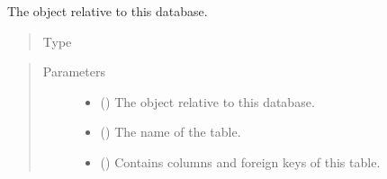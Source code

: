 \documentclass[letterpaper,10pt,english]{sphinxmanual}
\begin{document}
\begin{fulllineitems}
\begin{fulllineitems}
\begin{quote}
\begin{description}
\end{description}\end{quote}

\end{fulllineitems}


\begin{fulllineitems}
\label{\detokenize{model:simple_sql.model.table.Table.__metadata}}
\sphinxAtStartPar
The  object relative to this database.
\begin{quote}\begin{description}
\item[{Type}] \leavevmode
\sphinxAtStartPar
{\hyperref[\detokenize{metadata:simple_sql.metadata.MetaData}]{}}

\end{description}\end{quote}

\end{fulllineitems}

\begin{quote}\begin{description}
\item[{Parameters}] \leavevmode\begin{itemize}
\item {} 
\sphinxAtStartPar
{} ({\hyperref[\detokenize{metadata:simple_sql.metadata.MetaData}]{}}) \textendash{} The  object relative to this database.

\item {} 
\sphinxAtStartPar
{} () \textendash{} The name of the table.

\item {} 
\sphinxAtStartPar
{} (\sphinxstyleliteralemphasis{\sphinxupquote{{[}}}{\hyperref[\detokenize{model:simple_sql.model.column.Column}]{\sphinxcrossref{\sphinxstyleliteralemphasis{\sphinxupquote{Column}}}}}\sphinxstyleliteralemphasis{\sphinxupquote{{]}}}) \textendash{} Contains columns and foreign keys of this table.


\end{itemize}
\end{description}
\end{quote}
\end{fulllineitems}
\end{document}
